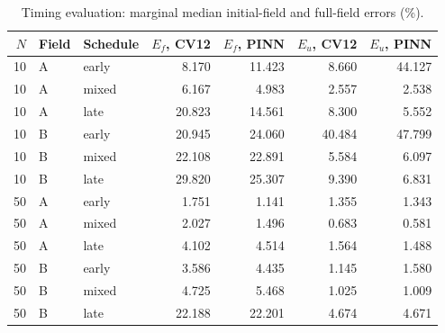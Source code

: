 \begin{table}[htbp]\centering\small
\caption{Timing evaluation: marginal median initial-field and full-field errors (\%).}\label{tab:fields}
\begin{tabular}{rllrrrr}\toprule
$N$ & Field & Schedule & $E_f$, CV12 & $E_f$, PINN & $E_u$, CV12 & $E_u$, PINN\\\midrule
10 & A & early & 8.170 & 11.423 & 8.660 & 44.127\\
10 & A & mixed & 6.167 & 4.983 & 2.557 & 2.538\\
10 & A & late & 20.823 & 14.561 & 8.300 & 5.552\\
10 & B & early & 20.945 & 24.060 & 40.484 & 47.799\\
10 & B & mixed & 22.108 & 22.891 & 5.584 & 6.097\\
10 & B & late & 29.820 & 25.307 & 9.390 & 6.831\\
50 & A & early & 1.751 & 1.141 & 1.355 & 1.343\\
50 & A & mixed & 2.027 & 1.496 & 0.683 & 0.581\\
50 & A & late & 4.102 & 4.514 & 1.564 & 1.488\\
50 & B & early & 3.586 & 4.435 & 1.145 & 1.580\\
50 & B & mixed & 4.725 & 5.468 & 1.025 & 1.009\\
50 & B & late & 22.188 & 22.201 & 4.674 & 4.671\\
\bottomrule\end{tabular}
\end{table}

